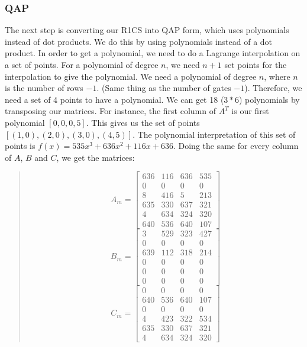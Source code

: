 \subsubsection{QAP}
The next step is converting our R1CS into QAP form, which uses polynomials instead of dot products.
We do this by using polynomials instead of a dot product.
In order to get a polynomial, we need to do a Lagrange interpolation on a set of points.
For a polynomial of degree $n$, we need $n+1$ set points for the interpolation to give the polynomial.
We need a polynomial of degree $n$, where $n$ is the number of rows $- 1$. (Same thing as the number of gates $-1$). 
Therefore, we need a set of 4 points to have a polynomial.
We can get 18 ($3*6$) polynomials by transposing our matrices.
For instance, the first column of $A^T$ is our first polynomial $[0,0,0,5]$.
This gives us the set of points $[(1,0),(2,0),(3,0),(4,5)]$.
The polynomial interpretation of this set of points is $f(x) = 535x^3+636x^2+116x+636$.
Doing the same for every column of $A$, $B$ and $C$, we get the matrices:
\begin{quote}
   \[
 A_m =
   \begin{bmatrix}
      636 & 116 & 636 & 535 \\
      0   & 0   & 0   & 0   \\
      8   & 416 & 5   & 213 \\
      635 & 330 & 637 & 321 \\
      4   & 634 & 324 & 320 \\
      640 & 536 & 640 & 107
   \end{bmatrix}
   \]
   \[
 B_m =
   \begin{bmatrix}
      3   & 529 & 323 & 427 \\
      0   & 0   & 0   & 0   \\
      639 & 112 & 318 & 214 \\
      0   & 0   & 0   & 0   \\
      0   & 0   & 0   & 0   \\
      0   & 0   & 0   & 0
   \end{bmatrix}
   \]
   \[
 C_m =
   \begin{bmatrix}
      0   & 0   & 0   & 0   \\
      640 & 536 & 640 & 107 \\
      0   & 0   & 0   & 0   \\
      4   & 423 & 322 & 534 \\
      635 & 330 & 637 & 321 \\
      4   & 634 & 324 & 320
   \end{bmatrix}
   \]
   \end{quote}
   
